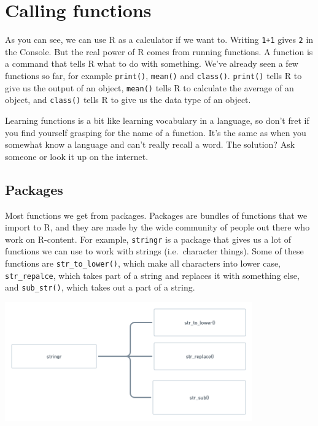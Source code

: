 \documentclass[
]{article}
\begin{document}
\hypertarget{calling-functions}{%
\section{Calling functions}\label{calling-functions}}

As you can see, we can use R as a calculator if we want to. Writing
\texttt{1+1} gives \texttt{2} in the Console. But the real power of R
comes from running functions. A function is a command that tells R what
to do with something. We've already seen a few functions so far, for
example \texttt{print()}, \texttt{mean()} and \texttt{class()}.
\texttt{print()} tells R to give us the output of an object,
\texttt{mean()} tells R to calculate the average of an object, and
\texttt{class()} tells R to give us the data type of an object.

Learning functions is a bit like learning vocabulary in a language, so
don't fret if you find yourself grasping for the name of a function.
It's the same as when you somewhat know a language and can't really
recall a word. The solution? Ask someone or look it up on the internet.

\hypertarget{packages}{%
\subsection{Packages}\label{packages}}

Most functions we get from packages. Packages are bundles of functions
that we import to R, and they are made by the wide community of people
out there who work on R-content. For example, \texttt{stringr} is a
package that gives us a lot of functions we can use to work with strings
(i.e.~character things). Some of these functions are
\texttt{str\_to\_lower()}, which make all characters into lower case,
\texttt{str\_repalce}, which takes part of a string and replaces it with
something else, and \texttt{sub\_str()}, which takes out a part of a
string.

\includegraphics[width=0.8\textwidth,height=\textheight]{./figures/packages.png}
\end{document}
